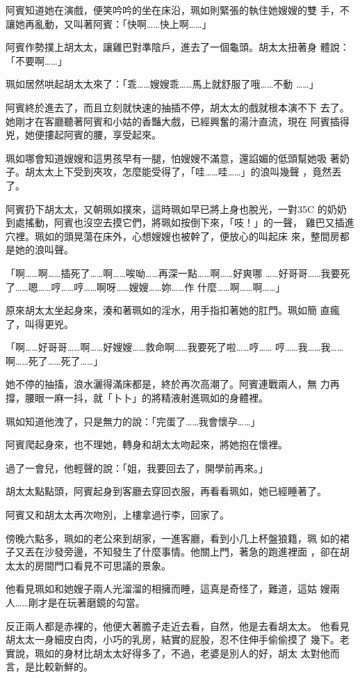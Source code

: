 阿賓知道她在演戲，便笑吟吟的坐在床沿，珮如則緊張的執住她嫂嫂的雙
手，不讓她再亂動，又叫著阿賓：「快啊……快上啊……」

阿賓作勢撲上胡太太，讓雞巴對準陰戶，進去了一個龜頭。胡太太扭著身
體說：「不要啊……」

珮如居然哄起胡太太來了：「乖……嫂嫂乖……馬上就舒服了哦……不動
……」

阿賓終於進去了，而且立刻就快速的抽插不停，胡太太的戲就根本演不下
去了。她剛才在客廳聽著阿賓和小姑的香豔大戲，已經興奮的湯汁直流，現在
阿賓插得兇，她便摟起阿賓的腰，享受起來。

珮如哪會知道嫂嫂和這男孩早有一腿，怕嫂嫂不滿意，還諂媚的低頭幫她吸
著奶子。胡太太上下受到夾攻，怎麼能受得了，「哇……哇……」的浪叫幾聲
，竟然丟了。

阿賓扔下胡太太，又朝珮如撲來，這時珮如早已將上身也脫光，一對35C
的奶奶到處搖動，阿賓也沒空去摸它們，將珮如按倒下來，「吱！」的一聲，
雞巴又插進穴裡。珮如的頭晃蕩在床外，心想嫂嫂也被幹了，便放心的叫起床
來，整間房都是她的浪叫聲。

「啊……啊……插死了……啊……唉呦……再深一點……啊……好爽哪
……好哥哥……我要死了……嗯……哼……哼……啊呀……嫂嫂……妳……作
什麼……啊……啊……」

原來胡太太坐起身來，湊和著珮如的淫水，用手指扣著她的肛門。珮如簡
直瘋了，叫得更兇。

「啊……好哥哥……啊……好嫂嫂……救命啊……我要死了啦……哼……
哼……我……我……啊……死了……死了……」

她不停的抽搐，浪水灑得滿床都是，終於再次高潮了。阿賓連戰兩人，無
力再撐，腰眼一麻一抖，就「卜卜」的將精液射進珮如的身體裡。

珮如知道他洩了，只是無力的說：「完蛋了……我會懷孕……」

阿賓爬起身來，也不理她，轉身和胡太太吻起來，將她抱在懷裡。

過了一會兒，他輕聲的說：「姐，我要回去了，開學前再來。」

胡太太點點頭，阿賓起身到客廳去穿回衣服，再看看珮如，她已經睡著了。

阿賓又和胡太太再次吻別，上樓拿過行李，回家了。

傍晚六點多，珮如的老公來到胡家，一進客廳，看到小几上杯盤狼籍，珮
如的裙子又丟在沙發旁邊，不知發生了什麼事情。他關上門，著急的跑進裡面
，卻在胡太太的房間門口看見不可思議的景象。

他看見珮如和她嫂子兩人光溜溜的相擁而睡，這真是奇怪了，難道，這姑
嫂兩人……剛才是在玩著磨鏡的勾當。

反正兩人都是赤裸的，他便大著膽子走近去看，自然，他是去看胡太太。
他看見胡太太一身細皮白肉，小巧的乳房，結實的屁股，忍不住伸手偷偷摸了
幾下。老實說，珮如的身材比胡太太好得多了，不過，老婆是別人的好，胡太
太對他而言，是比較新鮮的。

